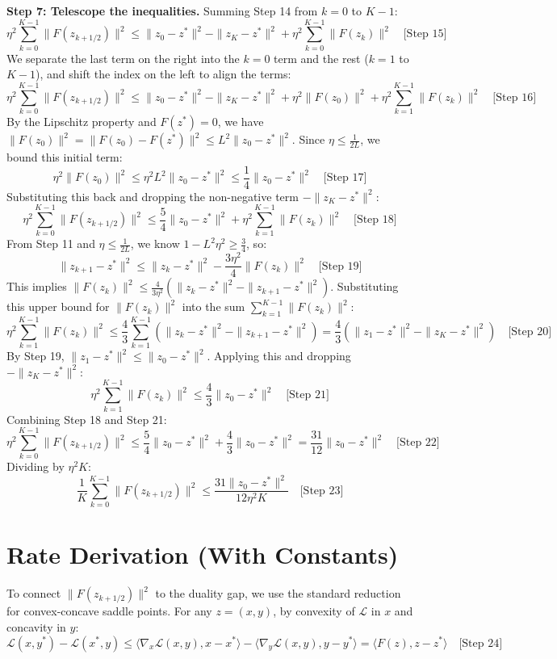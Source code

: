 \documentclass{article}
\begin{document}
\textbf{Step 7: Telescope the inequalities.}
Summing Step 14 from $k=0$ to $K-1$:
$$ \eta^2 \sum_{k=0}^{K-1} \|F(z_{k+1/2})\|^2 \leq \|z_0 - z^*\|^2 - \|z_K - z^*\|^2 + \eta^2 \sum_{k=0}^{K-1} \|F(z_k)\|^2 \quad \text{[Step 15]} $$
We separate the last term on the right into the $k=0$ term and the rest ($k=1$ to $K-1$), and shift the index on the left to align the terms:
$$ \eta^2 \sum_{k=0}^{K-1} \|F(z_{k+1/2})\|^2 \leq \|z_0 - z^*\|^2 - \|z_K - z^*\|^2 + \eta^2 \|F(z_0)\|^2 + \eta^2 \sum_{k=1}^{K-1} \|F(z_k)\|^2 \quad \text{[Step 16]} $$
By the Lipschitz property and $F(z^*) = 0$, we have $\|F(z_0)\|^2 = \|F(z_0) - F(z^*)\|^2 \leq L^2 \|z_0 - z^*\|^2$. Since $\eta \leq \frac{1}{2L}$, we bound this initial term:
$$ \eta^2 \|F(z_0)\|^2 \leq \eta^2 L^2 \|z_0 - z^*\|^2 \leq \frac{1}{4} \|z_0 - z^*\|^2 \quad \text{[Step 17]} $$
Substituting this back and dropping the non-negative term $-\|z_K - z^*\|^2$:
$$ \eta^2 \sum_{k=0}^{K-1} \|F(z_{k+1/2})\|^2 \leq \frac{5}{4} \|z_0 - z^*\|^2 + \eta^2 \sum_{k=1}^{K-1} \|F(z_k)\|^2 \quad \text{[Step 18]} $$
From Step 11 and $\eta \leq \frac{1}{2L}$, we know $1 - L^2\eta^2 \geq \frac{3}{4}$, so:
$$ \|z_{k+1} - z^*\|^2 \leq \|z_k - z^*\|^2 - \frac{3\eta^2}{4} \|F(z_k)\|^2 \quad \text{[Step 19]} $$
This implies $\|F(z_k)\|^2 \leq \frac{4}{3\eta^2}(\|z_k - z^*\|^2 - \|z_{k+1} - z^*\|^2)$. Substituting this upper bound for $\|F(z_k)\|^2$ into the sum $\sum_{k=1}^{K-1} \|F(z_k)\|^2$:
$$ \eta^2 \sum_{k=1}^{K-1} \|F(z_k)\|^2 \leq \frac{4}{3} \sum_{k=1}^{K-1} (\|z_k - z^*\|^2 - \|z_{k+1} - z^*\|^2) = \frac{4}{3}(\|z_1 - z^*\|^2 - \|z_K - z^*\|^2) \quad \text{[Step 20]} $$
By Step 19, $\|z_1 - z^*\|^2 \leq \|z_0 - z^*\|^2$. Applying this and dropping $-\|z_K - z^*\|^2$:
$$ \eta^2 \sum_{k=1}^{K-1} \|F(z_k)\|^2 \leq \frac{4}{3} \|z_0 - z^*\|^2 \quad \text{[Step 21]} $$
Combining Step 18 and Step 21:
$$ \eta^2 \sum_{k=0}^{K-1} \|F(z_{k+1/2})\|^2 \leq \frac{5}{4} \|z_0 - z^*\|^2 + \frac{4}{3} \|z_0 - z^*\|^2 = \frac{31}{12} \|z_0 - z^*\|^2 \quad \text{[Step 22]} $$
Dividing by $\eta^2 K$:
$$ \frac{1}{K} \sum_{k=0}^{K-1} \|F(z_{k+1/2})\|^2 \leq \frac{31 \|z_0 - z^*\|^2}{12 \eta^2 K} \quad \text{[Step 23]} $$

\section*{Rate Derivation (With Constants)}
To connect $\|F(z_{k+1/2})\|^2$ to the duality gap, we use the standard reduction for convex-concave saddle points. For any $z = (x, y)$, by convexity of $\mathcal{L}$ in $x$ and concavity in $y$:
$$ \mathcal{L}(x, y^*) - \mathcal{L}(x^*, y) \leq \langle \nabla_x \mathcal{L}(x, y), x - x^* \rangle - \langle \nabla_y \mathcal{L}(x, y), y - y^* \rangle = \langle F(z), z - z^* \rangle \quad \text{[Step 24]} $$
\end{document}
